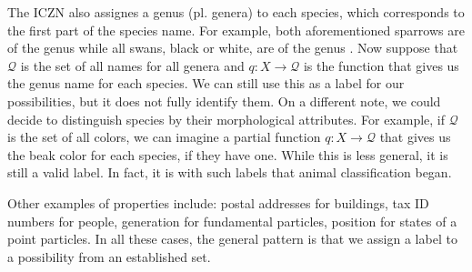 \documentclass[11pt,letterpaper,fleqn]{memoir} %
\begin{document}
The ICZN also assignes a genus (pl. genera) to each species, which corresponds to the first part of the species name. For example, both aforementioned sparrows are of the genus  while all swans, black or white, are of the genus . Now suppose that $\mathcal{Q}$ is the set of all names for all genera and $q: X \to \mathcal{Q}$ is the function that gives us the genus name for each species. We can still use this as a label for our possibilities, but it does not fully identify them. On a different note, we could decide to distinguish species by their morphological attributes. For example, if $\mathcal{Q}$ is the set of all colors, we can imagine a partial function $q: X \to \mathcal{Q}$ that gives us the beak color for each species, if they have one. While this is less general, it is still a valid label. In fact, it is with such labels that animal classification began.

Other examples of properties include: postal addresses for buildings, tax ID numbers for people, generation for fundamental particles, position for states of a point particles. In all these cases, the general pattern is that we assign a label to a possibility from an established set.
\end{document}
